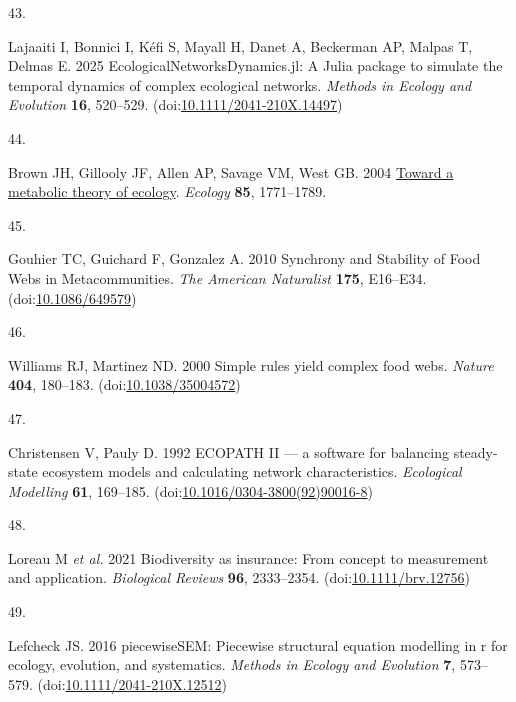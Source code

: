 \documentclass[
]{article}
\newlength{\cslhangindent}
\newlength{\csllabelwidth}
\newlength{\cslentryspacingunit} %
\newenvironment{CSLReferences}[2] %
 {%
  \setlength{\parindent}{0pt}
  \ifodd #1
  \let\oldpar\par
  \def\par{\hangindent=\cslhangindent\oldpar}
  \fi
  \setlength{\parskip}{#2\cslentryspacingunit}
 }%
 {}
\newcommand{\CSLLeftMargin}[1]{\parbox[t]{\csllabelwidth}{#1}}
\newcommand{\CSLRightInline}[1]{\parbox[t]{\linewidth - \csllabelwidth}{#1}\break}
\begin{document}
\begin{CSLReferences}{0}{0}
\leavevmode{}%
\CSLLeftMargin{43. }%
\CSLRightInline{Lajaaiti I, Bonnici I, Kéfi S, Mayall H, Danet A, Beckerman AP, Malpas T, Delmas E. 2025 {EcologicalNetworksDynamics}.jl: {A} {Julia} package to simulate the temporal dynamics of complex ecological networks. \emph{Methods in Ecology and Evolution} \textbf{16}, 520--529. (doi:\href{https://doi.org/10.1111/2041-210X.14497}{10.1111/2041-210X.14497})}

\leavevmode{}%
\CSLLeftMargin{44. }%
\CSLRightInline{Brown JH, Gillooly JF, Allen AP, Savage VM, West GB. 2004 \href{http://onlinelibrary.wiley.com/doi/10.1890/03-9000/full}{Toward a metabolic theory of ecology}. \emph{Ecology} \textbf{85}, 1771--1789.}

\leavevmode{}%
\CSLLeftMargin{45. }%
\CSLRightInline{Gouhier TC, Guichard F, Gonzalez A. 2010 Synchrony and {Stability} of {Food} {Webs} in {Metacommunities}. \emph{The American Naturalist} \textbf{175}, E16--E34. (doi:\href{https://doi.org/10.1086/649579}{10.1086/649579})}

\leavevmode{}%
\CSLLeftMargin{46. }%
\CSLRightInline{Williams RJ, Martinez ND. 2000 Simple rules yield complex food webs. \emph{Nature} \textbf{404}, 180--183. (doi:\href{https://doi.org/10.1038/35004572}{10.1038/35004572})}

\leavevmode{}%
\CSLLeftMargin{47. }%
\CSLRightInline{Christensen V, Pauly D. 1992 {ECOPATH} {II} --- a software for balancing steady-state ecosystem models and calculating network characteristics. \emph{Ecological Modelling} \textbf{61}, 169--185. (doi:\href{https://doi.org/10.1016/0304-3800(92)90016-8}{10.1016/0304-3800(92)90016-8})}

\leavevmode{}%
\CSLLeftMargin{48. }%
\CSLRightInline{Loreau M \emph{et al.} 2021 Biodiversity as insurance: From concept to measurement and application. \emph{Biological Reviews} \textbf{96}, 2333--2354. (doi:\href{https://doi.org/10.1111/brv.12756}{10.1111/brv.12756})}

\leavevmode{}%
\CSLLeftMargin{49. }%
\CSLRightInline{Lefcheck JS. 2016 {piecewiseSEM}: {Piecewise} structural equation modelling in r for ecology, evolution, and systematics. \emph{Methods in Ecology and Evolution} \textbf{7}, 573--579. (doi:\href{https://doi.org/10.1111/2041-210X.12512}{10.1111/2041-210X.12512})}


\end{CSLReferences}
\end{document}
